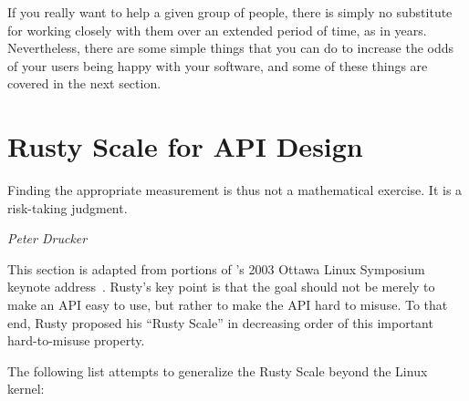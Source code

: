If you really want to help a given group of people, there is simply no
substitute for working closely with them over an extended period of time,
as in years.
Nevertheless, there are some simple things that you can do to increase
the odds of your users being happy with your software, and some of these
things are covered in the next section.

\section{Rusty Scale for API Design}
\label{sec:easy:Rusty Scale for API Design}
%
\epigraph{Finding the appropriate measurement is thus not a mathematical
	  exercise.
	  It is a risk-taking judgment.}
	 {\emph{Peter Drucker}}

This section is adapted from portions of 's 2003 Ottawa Linux
Symposium keynote address~\cite[Slides~39--57]{RustyRussell2003OLSkeynote}.
Rusty's key point is that the goal should not be merely to make an API
easy to use, but rather to make the API hard to misuse.
To that end, Rusty proposed his ``Rusty Scale'' in decreasing order
of this important hard-to-misuse property.

The following list attempts to generalize the Rusty Scale beyond the
Linux kernel:

